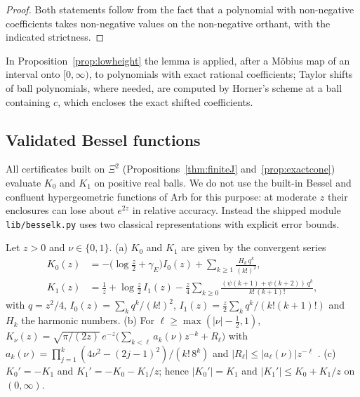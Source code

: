 \begin{proof}
Both statements follow from the fact that a polynomial with non-negative coefficients takes non-negative values
on the non-negative orthant, with the indicated strictness.
\end{proof}

In Proposition~\ref{prop:lowheight} the lemma is applied, after a M\"obius map of an interval onto $[0,\infty)$, to polynomials with
exact rational coefficients; Taylor shifts of ball polynomials, where needed, are computed by Horner's scheme at a ball containing $c$,
which encloses the exact shifted coefficients.

\subsection{Validated Bessel functions}

All certificates built on $\Xi^2$ (Propositions~\ref{thm:finiteJ} and~\ref{prop:exactcone}) evaluate $K_0$ and $K_1$ on positive real balls. We do not use the built-in Bessel
and confluent hypergeometric functions of Arb for this purpose: at moderate $z$ their enclosures can lose about $e^{2z}$
in relative accuracy. Instead the shipped module \nolinkurl{lib/besselk.py} uses two classical representations with
explicit error bounds.

\begin{lemma}\label{lem:K-validated}
Let $z>0$ and $\nu\in\{0,1\}$.
\textup{(a)} $K_0$ and $K_1$ are given by the convergent series \cite[10.31.2, 10.31.1]{DLMF}
\[
  \begin{aligned}
  K_0(z)&=-\bigl(\log\tfrac z2+\gamma_E\bigr)I_0(z)+\sum_{k\ge1}\frac{H_k\,q^k}{(k!)^2},\\
  K_1(z)&=\frac1z+\log\tfrac z2\,I_1(z)-\frac z4\sum_{k\ge0}\frac{(\psi(k+1)+\psi(k+2))\,q^k}{k!\,(k+1)!},
  \end{aligned}
\]
with $q=z^2/4$, $I_0(z)=\sum_kq^k/(k!)^2$, $I_1(z)=\frac z2\sum_kq^k/(k!(k+1)!)$ and $H_k$ the harmonic numbers.
\textup{(b)} For $\ell\ge\max(|\nu|-\frac12,1)$, $K_\nu(z)=\sqrt{\pi/(2z)}\,e^{-z}\bigl(\sum_{k<\ell}a_k(\nu)z^{-k}+R_\ell\bigr)$ with
$a_k(\nu)=\prod_{j=1}^k(4\nu^2-(2j-1)^2)/(k!\,8^k)$ and $|R_\ell|\le|a_\ell(\nu)|z^{-\ell}$ \cite[10.40.2 and
\S10.40(ii)]{DLMF}.
\textup{(c)} $K_0'=-K_1$ and $K_1'=-K_0-K_1/z$; hence $|K_0'|=K_1$ and $|K_1'|\le K_0+K_1/z$ on $(0,\infty)$.
\end{lemma}

